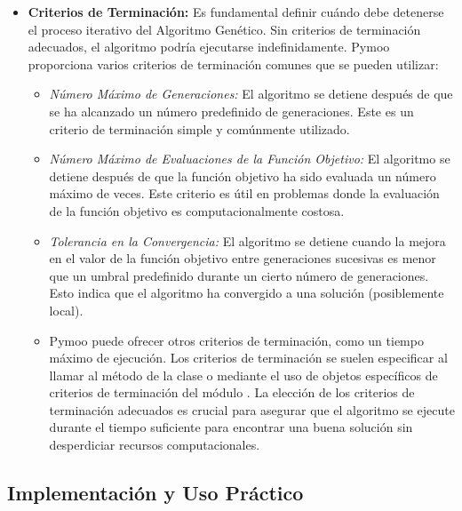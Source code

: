 \begin{itemize}[label=\textbullet, leftmargin=*]
    \item \textbf{Criterios de Terminación:} Es fundamental definir cuándo debe detenerse el proceso iterativo del Algoritmo Genético. Sin criterios de terminación adecuados, el algoritmo podría ejecutarse indefinidamente. Pymoo proporciona varios criterios de terminación comunes que se pueden utilizar:
    \begin{itemize}[label=\textbullet, leftmargin=*] %
        \item \textit{Número Máximo de Generaciones:} El algoritmo se detiene después de que se ha alcanzado un número predefinido de generaciones. Este es un criterio de terminación simple y comúnmente utilizado.
        \item \textit{Número Máximo de Evaluaciones de la Función Objetivo:} El algoritmo se detiene después de que la función objetivo ha sido evaluada un número máximo de veces. Este criterio es útil en problemas donde la evaluación de la función objetivo es computacionalmente costosa.
        \item \textit{Tolerancia en la Convergencia:} El algoritmo se detiene cuando la mejora en el valor de la función objetivo entre generaciones sucesivas es menor que un umbral predefinido durante un cierto número de generaciones. Esto indica que el algoritmo ha convergido a una solución (posiblemente local).
        \item Pymoo puede ofrecer otros criterios de terminación, como un tiempo máximo de ejecución. Los criterios de terminación se suelen especificar al llamar al método \texttt{} de la clase \texttt{} o mediante el uso de objetos específicos de criterios de terminación del módulo \texttt{}. La elección de los criterios de terminación adecuados es crucial para asegurar que el algoritmo se ejecute durante el tiempo suficiente para encontrar una buena solución sin desperdiciar recursos computacionales.
    \end{itemize}
\end{itemize}

\subsection{Implementación y Uso Práctico}


